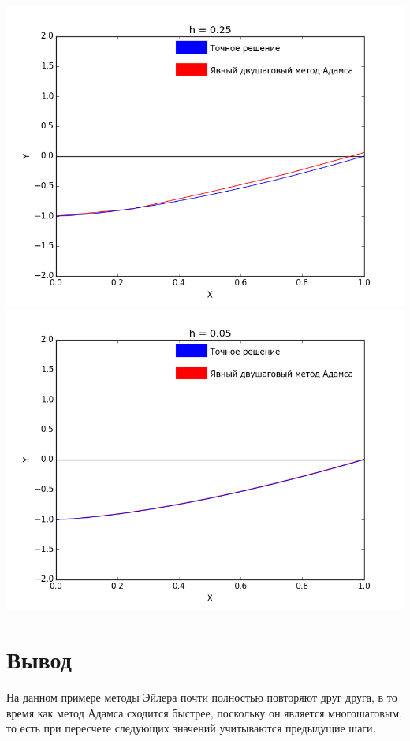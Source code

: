 \documentclass[12pt,a4paper]{article}
\begin{document}
        \includegraphics[scale=0.45]{adamsGraph_Step=0_25}\\
        \includegraphics[scale=0.45]{adamsGraph_Step=0_05}
        
    \section*{Вывод}
        На данном примере методы Эйлера почти полностью повторяют друг друга,
        в то время как метод Адамса сходится быстрее, поскольку он является
        многошаговым, то есть при пересчете следующих значений учитываются предыдущие
        шаги.
    \newpage
    
\end{document}
